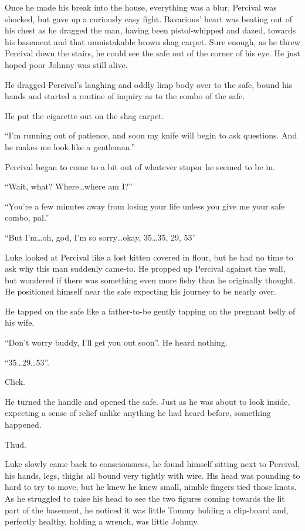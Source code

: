 Once he made his break into the house, everything was a blur.
Percival was shocked, but gave up a curiously easy fight.
Bavarious' heart was beating out of his chest as he dragged
the man, having been pistol-whipped and dazed, towards his basement
and that unmistakable brown shag carpet. Sure enough, as he threw
Percival down the stairs, he could see the safe out of the corner
of his eye. He just hoped poor Johnny was still alive.



He dragged Percival's laughing and oddly limp body over to
the safe, bound his hands and started a routine of inquiry as to
the combo of the safe.



He put the cigarette out on the shag carpet.



``I'm running out of patience, and soon my knife will
begin to ask questions. And he makes me look like a
gentleman.''

Percival began to come to a bit out of whatever stupor he seemed to
be in.

``Wait, what? Where{\ldots}where am I?''

``You're a few minutes away from losing your life unless
you give me your safe combo, pal.''

``But I'm{\ldots}oh, god, I'm so
sorry{\ldots}okay, 35{\ldots}35, 29, 53''



Luke looked at Percival like a lost kitten covered in flour, but he
had no time to ask why this man suddenly came-to. He propped up
Percival against the wall, but wondered if there was something even
more fishy than he originally thought. He positioned himself near
the safe expecting his journey to be nearly over.



He tapped on the safe like a father-to-be gently tapping on the
pregnant belly of his wife.

``Don't worry buddy, I'll get you out soon''.
He heard nothing.

``35{\ldots}29{\ldots}53''.

Click.

He turned the handle and opened the safe. Just as he was about to
look inside, expecting a sense of relief unlike anything he had
heard before, something happened.

Thud.



Luke slowly came back to consciousness, he found himself sitting
next to Percival, his hands, legs, thighs all bound very tightly
with wire. His head was pounding to hard to try to move, but he
knew he knew small, nimble fingers tied those knots. As he
struggled to raise his head to see the two figures coming towards
the lit part of the basement, he noticed it was little Tommy
holding a clip-board and, perfectly healthy, holding a wrench, was
little Johnny.



